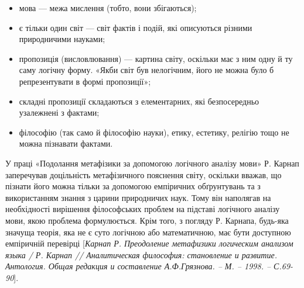 \begin{itemize}
	\item мова --- межа мислення (тобто, вони збігаються);
	
	\item є тільки один світ --- світ фактів і подій, які описуються різними
	природничими науками;
	
	\item пропозиція (висловлювання) --- картина світу, оскільки має з ним одну й
	ту саму логічну форму. «Якби світ був нелогічним, його не можна було б
	репрезентувати в формі пропозиції»;
	
	\item складні пропозиції складаються з елементарних, які безпосередньо
	узалежнені з фактами;
	
	\item філософію (так само й філософію науки), етику, естетику, релігію тощо
	не можна пізнавати фактами.
\end{itemize}

У праці «Подолання метафізики за допомогою логічного аналізу мови» Р.
Карнап заперечував доцільність метафізичного пояснення світу, оскільки
вважав, що пізнати його можна тільки за допомогою емпіричних обґрунтувань
та з використанням знання з царини природничих наук. Тому він наполягав на
необхідності вирішення філософських проблем на підставі логічного аналізу
мови, якою проблема формулюється. Крім того, з погляду Р. Карнапа, будь-яка
значуща теорія, яка не є суто логічною або математичною, має бути доступною
емпіричній перевірці [\textit{Карнап Р. Преодоление метафизики логическим
анализом языка / Р. Карнап // Аналитическая философия: становление и
развитие. Антология. Общая редакция и составление А.Ф.Грязнова. – М. –
1998. – С.69-90}].

